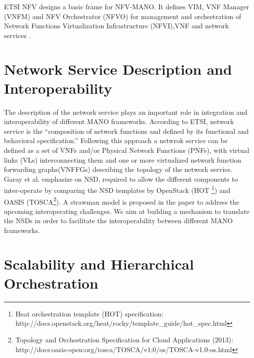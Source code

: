 ETSI NFV designs a basic frame for NFV-MANO. It defines VIM, VNF Manager (VNFM) and NFV Orchestrator (NFVO) for management and orchestration of Network Functions Virtualization Infrastructure (NFVI),VNF and network services \cite{etsi2014gs}.


\section{Network Service Description and Interoperability}
\label{serviceDescription}
\paragraph{}
The description of the network service plays an important role in integration and interoperability of different MANO frameworks. According to ETSI, network service is the “composition of network functions and defined by its functional and behavioral specification.” Following this approach a netwrok service can be defined as a set of VNFs and/or Physical Network Functions (PNFs), with virtual links (VLs) interconnecting them and one or more virtualized network function forwarding graphs(VNFFGs) describing the topology of the network service.\\

Garay et al. \cite{garay_service_2016} emphasize on NSD, required to allow the different components to inter-operate by comparing the NSD templates by OpenStack (HOT \footnote{Heat orchestration template (HOT) specification:        \\http://docs.openstack.org/heat/rocky/template\_guide/hot\_spec.html}) and OASIS (TOSCA\footnote{Topology and Orchestration Specification for Cloud Applications (2013):\\ http://docs:oasis-open:org/tosca/TOSCA/v1:0/os/TOSCA-v1.0-os.html}). A strawman model is proposed in the paper to address the upcoming interoperating challenges. We aim at building a mechanism to translate the NSDs in order to facilitate the interoperability between different MANO frameworks.




\section{Scalability and Hierarchical Orchestration}
\label{manoscale}

